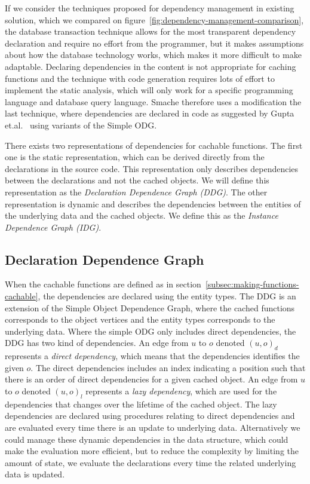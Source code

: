 If we consider the techniques proposed for dependency management in existing solution, which we compared on figure~\ref{fig:dependency-management-comparison}, the database transaction technique allows for the most transparent dependency declaration and require no effort from the programmer, but it makes assumptions about how the database technology works, which makes it more difficult to make adaptable. Declaring dependencies in the content is not appropriate for caching functions and the technique with code generation requires lots of effort to implement the static analysis, which will only work for a specific programming language and database query language. Smache therefore uses a modification the last technique, where dependencies are declared in code as suggested by Gupta et.al.~\cite{paper:cache-genie} using variants of the Simple ODG.

There exists two representations of dependencies for cachable functions. The first one is the static representation, which can be derived directly from the declarations in the source code. This representation only describes dependencies between the declarations and not the cached objects. We will define this representation as the \emph{Declaration Dependence Graph (DDG)}. The other representation is dynamic and describes the dependencies between the entities of the underlying data and the cached objects. We define this as the \emph{Instance Dependence Graph (IDG)}.

\subsection{Declaration Dependence Graph}
\label{subsec:declaration-dependence-graph}

When the cachable functions are defined as in section~\ref{subsec:making-functions-cachable}, the dependencies are declared using the entity types. The DDG is an extension of the Simple Object Dependence Graph, where the cached functions corresponds to the object vertices and the entity types corresponds to the underlying data. Where the simple ODG only includes direct dependencies, the DDG has two kind of dependencies. An edge from $u$ to $o$ denoted $(u, o)_d$ represents a \emph{direct dependency}, which means that the dependencies identifies the given $o$. The direct dependencies includes an index indicating a position such that there is an order of direct dependencies for a given cached object. An edge from $u$ to $o$ denoted $(u, o)_l$ represents a \emph{lazy dependency}, which are used for the dependencies that changes over the lifetime of the cached object. The lazy dependencies are declared using procedures relating to direct dependencies and are evaluated every time there is an update to underlying data. Alternatively we could manage these dynamic dependencies in the data structure, which could make the evaluation more efficient, but to reduce the complexity by limiting the amount of state, we evaluate the declarations every time the related underlying data is updated.

